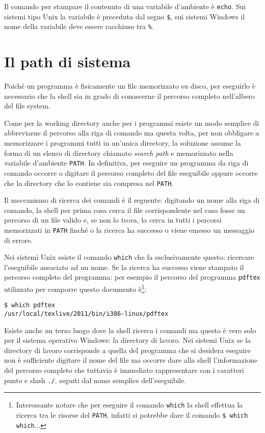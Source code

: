 Il comando per stampare il contenuto di una variabile d'ambiente è
\texttt{echo}. Sui sistemi tipo Unix la variabile è preceduta dal segno
\texttt{\$}, sui sistemi Windows il nome della variabile deve essere racchiuso
tra \texttt{\%}.

\section{Il path di sistema}

Poiché un programma è fisicamente un file memorizzato su disco, per eseguirlo è
necessario che la shell sia in grado di conoscerne il percorso completo
nell'albero del file system.

Come per la working directory anche per i programmi esiste un modo semplice di
abbreviarne il percorso alla riga di comando ma questa volta, per non obbligare
a memorizzare i programmi tutti in un'unica directory, la soluzione assume la
forma di un elenco di directory chiamato \emph{search path} e memorizzato nella
variabile d'ambiente \texttt{PATH}. In definitiva, per eseguire un programma da
riga di comando occorre o digitare il percorso completo del file eseguibile
oppure occorre che la directory che lo contiene sia compresa nel \texttt{PATH}.

Il meccanismo di ricerca dei comandi è il seguente: digitando un nome alla riga
di comando, la shell per prima cosa cerca il file corrispondente nel caso fosse
un percorso di un file valido e, se non lo trova, lo cerca in tutti i percorsi
memorizzati in \texttt{PATH} finché o la ricerca ha successo o viene emesso un
messaggio di errore.

Nei sistemi Unix esiste il comando \texttt{which} che fa esclusivamente questo:
ricercare l'eseguibile associato ad un nome. Se la ricerca ha successo viene
stampato il percorso completo del programma: per esempio il percorso del
programma \texttt{pdftex} utilizzato per comporre questo documento
è\footnote{Interessante notare che per eseguire il comando \texttt{which} la
shell effettua la ricerca tra le risorse del \texttt{PATH}, infatti si potrebbe
dare il comando \texttt{\$ which which}...}:
\begin{verbatim}
$ which pdftex
/usr/local/texlive/2011/bin/i386-linux/pdftex
\end{verbatim}

Esiste anche un terzo luogo dove la shell ricerca i comandi ma questo è vero
solo per il sistema operativo Windows: la directory di lavoro. Nei sistemi Unix
se la directory di lavoro corrisponde a quella del programma che si desidera
eseguire non è sufficiente digitare il nome del file ma occorre dare alla shell
l'informazione del percorso completo che tuttavia è immediato rappresentare con
i caratteri punto e slash \texttt{./}, seguiti dal nome semplice
dell'eseguibile.

